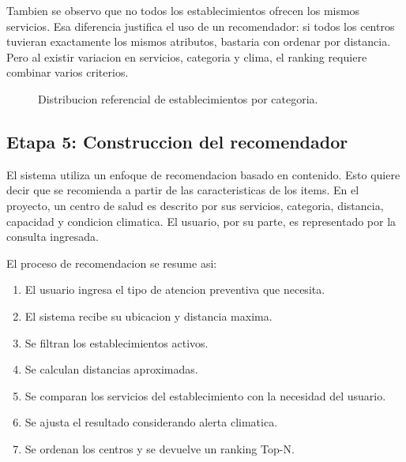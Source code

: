 \documentclass[12pt,a4paper]{article}
\begin{document}
Tambien se observo que no todos los establecimientos ofrecen los mismos servicios. Esa diferencia justifica el uso de un recomendador: si todos los centros tuvieran exactamente los mismos atributos, bastaria con ordenar por distancia. Pero al existir variacion en servicios, categoria y clima, el ranking requiere combinar varios criterios.

\begin{figure}[H]
\centering
{}
\caption{Distribucion referencial de establecimientos por categoria.}
\label{fig:categorias}
\end{figure}

\subsection{Etapa 5: Construccion del recomendador}
El sistema utiliza un enfoque de recomendacion basado en contenido. Esto quiere decir que se recomienda a partir de las caracteristicas de los items. En el proyecto, un centro de salud es descrito por sus servicios, categoria, distancia, capacidad y condicion climatica. El usuario, por su parte, es representado por la consulta ingresada.

El proceso de recomendacion se resume asi:

\begin{enumerate}[leftmargin=*]
  \item El usuario ingresa el tipo de atencion preventiva que necesita.
  \item El sistema recibe su ubicacion y distancia maxima.
  \item Se filtran los establecimientos activos.
  \item Se calculan distancias aproximadas.
  \item Se comparan los servicios del establecimiento con la necesidad del usuario.
  \item Se ajusta el resultado considerando alerta climatica.
  \item Se ordenan los centros y se devuelve un ranking Top-N.
\end{enumerate}
\end{document}
